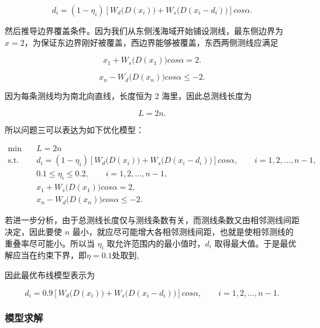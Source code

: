 \documentclass[UTF-8,a4paper,zihao=-4]{ctexart}
\begin{document}
\begin{equation}
d_i=(1-\eta_i)\left[W_d\bigl(D(x_i)\bigr)+W_s\bigl(D(x_i-d_i)\bigr)\right]cos\alpha.
\end{equation}

然后推导边界覆盖条件。因为我们从东侧浅海域开始铺设测线，最东侧边界为 $x=2$，为保证东边界刚好被覆盖，西边界能够被覆盖，东西两侧测线应满足

\begin{equation}
x_1+W_s\bigl(D(x_1)\bigr)cos\alpha=2.
\end{equation}

\begin{equation}
x_n-W_d\bigl(D(x_n)\bigr)cos\alpha\le -2.
\end{equation}

因为每条测线均为南北向直线，长度恒为 $2$ 海里，因此总测线长度为

\begin{equation}
L=2n.
\end{equation}

所以问题三可以表达为如下优化模型：

\begin{equation}
\begin{aligned}
    \min\quad & L=2n\\
    \text{s.t.}\quad 
    & d_i=(1-\eta_i)\left[W_d\bigl(D(x_i)\bigr)+W_s\bigl(D(x_i-d_i)\bigr)\right]cos\alpha,
\qquad i=1,2,\ldots,n-1,\\
    & 0.1\le \eta_i\le 0.2,
\qquad i=1,2,\ldots,n-1,\\
    & x_1+W_s\bigl(D(x_1)\bigr)cos\alpha=2,\\
    & x_n-W_d\bigl(D(x_n)\bigr)cos\alpha\le -2.
\end{aligned}
\end{equation}

若进一步分析，由于总测线长度仅与测线条数有关，而测线条数又由相邻测线间距决定，因此要使 $n$ 最小，就应尽可能增大各相邻测线间距，也就是使相邻测线的重叠率尽可能小。所以当 $\eta_i$ 取允许范围内的最小值时，$d_i$ 取得最大值。于是最优解应当在约束下界，即$\eta=0.1$处取到,

因此最优布线模型表示为

\begin{equation}
d_i=0.9\left[W_d\bigl(D(x_i)\bigr)+W_s\bigl(D(x_i-d_i)\bigr)\right]cos\alpha,
\qquad i=1,2,\ldots,n-1.
\end{equation}

\subsubsection{模型求解}
\end{document}
